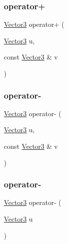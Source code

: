 \subsubsection{\texorpdfstring{operator+}{operator+}}
{\footnotesize\ttfamily \mbox{\hyperlink{class_vector3}{Vector3}} operator+ (\begin{DoxyParamCaption}\item[{\mbox{\hyperlink{class_vector3}{Vector3}}}]{u,  }\item[{const \mbox{\hyperlink{class_vector3}{Vector3}} \&}]{v }\end{DoxyParamCaption})\hspace{0.3cm}{\ttfamily [friend]}}

\mbox{\label{class_vector3_ad504438b7c6757ab73c48013919f8333}} 
\subsubsection{\texorpdfstring{operator-\/}{operator-}\hspace{0.1cm}{\footnotesize\ttfamily [1/2]}}
{\footnotesize\ttfamily \mbox{\hyperlink{class_vector3}{Vector3}} operator-\/ (\begin{DoxyParamCaption}\item[{\mbox{\hyperlink{class_vector3}{Vector3}}}]{u,  }\item[{const \mbox{\hyperlink{class_vector3}{Vector3}} \&}]{v }\end{DoxyParamCaption})\hspace{0.3cm}{\ttfamily [friend]}}

\mbox{\label{class_vector3_a0e55d4adeebd39752a52dff8a1062bec}} 
\subsubsection{\texorpdfstring{operator-\/}{operator-}\hspace{0.1cm}{\footnotesize\ttfamily [2/2]}}
{\footnotesize\ttfamily \mbox{\hyperlink{class_vector3}{Vector3}} operator-\/ (\begin{DoxyParamCaption}\item[{\mbox{\hyperlink{class_vector3}{Vector3}}}]{u }\end{DoxyParamCaption})\hspace{0.3cm}{\ttfamily [friend]}}

